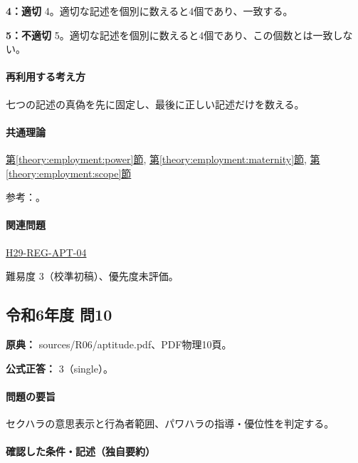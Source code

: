 \noindent\textbf{4：適切} 4。適切な記述を個別に数えると4個であり、一致する。\par

\noindent\textbf{5：不適切} 5。適切な記述を個別に数えると4個であり、この個数とは一致しない。\par

\paragraph{再利用する考え方} 七つの記述の真偽を先に固定し、最後に正しい記述だけを数える。

\paragraph{共通理論} \hyperref[theory:employment:power]{第\ref*{theory:employment:power}節}, \hyperref[theory:employment:maternity]{第\ref*{theory:employment:maternity}節}, \hyperref[theory:employment:scope]{第\ref*{theory:employment:scope}節}

\par 参考：\cite{employment_power2012,employment_power_current,employment_sexual_current,employment_sexual2018,employment_sexual2018}。

\paragraph{関連問題} \hyperref[q:h29-reg-apt-04]{H29-REG-APT-04}

\par 難易度 3（校準初稿）、優先度未評価。

\subsection{令和6年度 問10}
\label{q:r06-reg-apt-10}

\noindent\textbf{原典：} sources/R06/aptitude.pdf、PDF物理10頁。

\textbf{公式正答：} 3（single）。

\paragraph{問題の要旨} セクハラの意思表示と行為者範囲、パワハラの指導・優位性を判定する。

\paragraph{確認した条件・記述（独自要約）}\mbox{}\par


